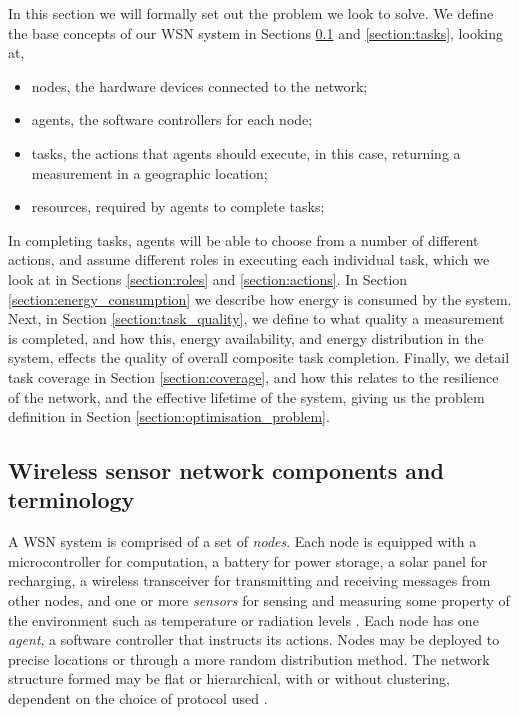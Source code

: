
In this section we will formally set out the problem we look to solve. We define the base concepts of our WSN system in Sections \ref{section:terminology} and \ref{section:tasks}, looking at,
\begin{itemize}
	\item nodes, the hardware devices connected to the network;
	\item agents, the software controllers for each node;
	\item tasks, the actions that agents should execute, in this case, returning a measurement in a geographic location;
	\item resources, required by agents to complete tasks; 
\end{itemize}
In completing tasks, agents will be able to choose from a number of different actions, and assume different roles in executing each individual task, which we look at in Sections \ref{section:roles} and \ref{section:actions}. In Section \ref{section:energy_consumption} we describe how energy is consumed by the system. Next, in Section \ref{section:task_quality}, we define to what quality a measurement is completed, and how this, energy availability, and energy distribution in the system, effects the quality of overall composite task completion. Finally, we detail task coverage in Section \ref{section:coverage}, and how this relates to the resilience of the network, and the effective lifetime of the system, giving us the problem definition in Section \ref{section:optimisation_problem}.

\subsection{Wireless sensor network components and terminology}
\label{section:terminology}

A WSN system is comprised of a set of \textit{nodes}. Each node is equipped with a microcontroller for computation, a battery for power storage, a solar panel for recharging, a wireless transceiver for  transmitting and receiving messages from other nodes, and one or more \textit{sensors} for sensing and measuring some property of the environment such as temperature or radiation levels \citep{muhammad_r_ahmed_2012_1072589}. Each node has one \textit{agent}, a software controller that instructs its actions. Nodes may be deployed to precise locations or through a more random distribution method. The network structure formed may be flat or hierarchical, with or without clustering, dependent on the choice of protocol used \citep{Carlos-Mancilla2016b}. 

